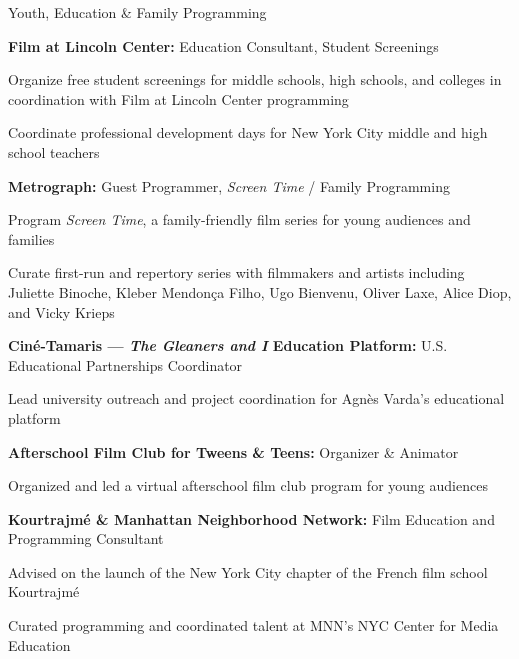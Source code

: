 \begin{rubric}{Youth, Education \& Family Programming}
\AdeNoentry

  \entry*[2023-present]%
  \textbf{Film at Lincoln Center:} Education Consultant, Student Screenings
  \par
  \begin{cvitems}
    \item Organize free student screenings for middle schools, high schools, and colleges
      in coordination with Film at Lincoln Center programming
    \item Coordinate professional development days for New York City middle and high school
      teachers
  \end{cvitems}

  \entry*[2022-present]%
  \textbf{Metrograph:} Guest Programmer, \textit{Screen Time} / Family Programming
  \par
  \begin{cvitems}
    \item Program \textit{Screen Time}, a family-friendly film series for young audiences
      and families
    \item Curate first-run and repertory series with filmmakers and artists including
      Juliette Binoche, Kleber Mendon\c{c}a Filho, Ugo Bienvenu, Oliver Laxe, Alice Diop,
      and Vicky Krieps
  \end{cvitems}

  \entry*[2024-present]%
  \textbf{Cin\'e-Tamaris --- \textit{The Gleaners and I} Education Platform:}
  U.S. Educational Partnerships Coordinator
  \par
  \begin{cvitems}
    \item Lead university outreach and project coordination for Agn\`es Varda's educational
      platform
  \end{cvitems}

  \entry*[2019-2023]%
  \textbf{Afterschool Film Club for Tweens \& Teens:} Organizer \& Animator
  \par
  \begin{cvitems}
    \item Organized and led a virtual afterschool film club program for young audiences
  \end{cvitems}

  \entry*[2023-2024]%
  \textbf{Kourtrajm\'e \& Manhattan Neighborhood Network:}
  Film Education and Programming Consultant
  \par
  \begin{cvitems}
    \item Advised on the launch of the New York City chapter of the French film school
      Kourtrajm\'e
    \item Curated programming and coordinated talent at MNN's NYC Center for Media
      Education
  \end{cvitems}

\end{rubric}
